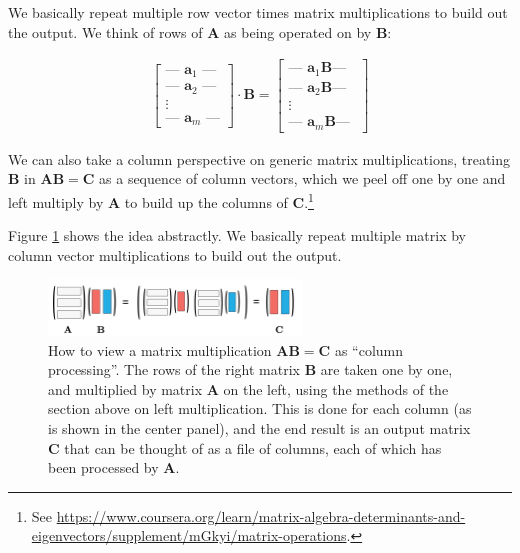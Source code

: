 We basically repeat multiple row vector times matrix multiplications to build out the output. We think of rows of $\mathbf{A}$ as being operated on by $\mathbf{B}$:

\begin{align*}
\begin{bmatrix}
\text{--- } \mathbf{a}_1 \text{ ---} \\
\text{--- } \mathbf{a}_2 \text{ ---} \\
\vdots \\
\text{--- } \mathbf{a}_m \text{ ---}
\end{bmatrix}
\cdot
\mathbf{B}
=
\begin{bmatrix}
\text{--- } \mathbf{a}_1 \mathbf{B} \text{--- } \\
\text{--- } \mathbf{a}_2 \mathbf{B} \text{--- } \\
\vdots \\
\text{--- } \mathbf{a}_m \mathbf{B} \text{--- }
\end{bmatrix}
\end{align*}

We can also take a column perspective on generic matrix multiplications, treating $\mathbf{B}$ in $\mathbf{A}\mathbf{B} = \mathbf{C}$ as a sequence of column vectors, which we peel off one by one and left multiply by $\mathbf{A}$ to build up the columns of $\mathbf{C}$.\footnote{See \url{https://www.coursera.org/learn/matrix-algebra-determinants-and-eigenvectors/supplement/mGkyi/matrix-operations}.} 

Figure \ref{columnPerspective} shows the idea abstractly. We basically repeat multiple matrix by column vector multiplications to build out the output. 

\begin{figure}[h]
\centering
\includegraphics[width=0.6\textwidth]{images/columnPerspective.png}
\caption[Jeff Yoshimi.]{How to view a matrix multiplication  $\mathbf{A}\mathbf{B} = \mathbf{C}$ as ``column processing''.  The rows of the right matrix $\mathbf{B}$ are taken one by one, and multiplied by matrix $\mathbf{A}$  on the left, using the methods of the section above on left multiplication.  This is done for each column (as is shown in the center panel), and the end result is an output matrix $\mathbf{C}$ that can be thought of as a file of columns, each of which has been processed by $\mathbf{A}$.}
\label{columnPerspective}
\end{figure} 

